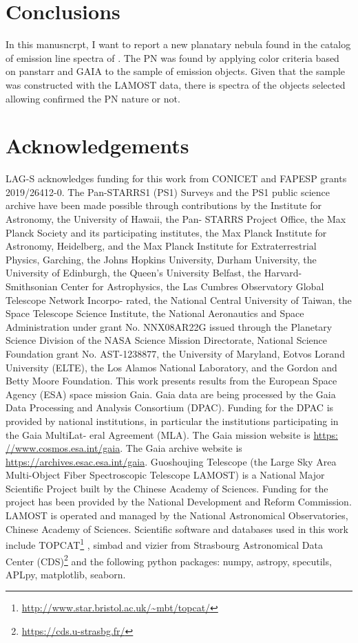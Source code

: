 \documentclass[fleqn,usenatbib]{mnras}
\begin{document}
{\section{Conclusions}
\label{sec:conclu}

In this manusncrpt, I want to report a new planatary nebula found
in the catalog of emission line spectra of \citet{Skoda:2020}.
The PN was found by applying color criteria based on panstarr
and GAIA to the sample of emission objects.
Given that the \citet{Skoda:2020} sample was constructed
with the LAMOST data, there is spectra of the objects selected
allowing confirmed the PN nature or not.

\section*{Acknowledgements}

LAG-S acknowledges funding for this work
from CONICET and FAPESP grants 2019/26412-0.
The Pan-STARRS1 (PS1) Surveys and the PS1 public science
archive have been made possible through contributions by the
Institute for Astronomy, the University of Hawaii, the Pan-
STARRS Project Office, the Max Planck Society and its
participating institutes, the Max Planck Institute for Astronomy,
Heidelberg, and the Max Planck Institute for Extraterrestrial
Physics, Garching, the Johns Hopkins University, Durham
University, the University of Edinburgh, the Queen’s University
Belfast, the Harvard-Smithsonian Center for Astrophysics, the
Las Cumbres Observatory Global Telescope Network Incorpo-
rated, the National Central University of Taiwan, the Space
Telescope Science Institute, the National Aeronautics and Space
Administration under grant No. NNX08AR22G issued through
the Planetary Science Division of the NASA Science Mission
Directorate, National Science Foundation grant No. AST-1238877,
the University of Maryland, Eotvos Lorand University
(ELTE), the Los Alamos National Laboratory, and the Gordon
and Betty Moore Foundation.
This work presents results from the European Space Agency
(ESA) space mission Gaia. Gaia data are being processed by
the Gaia Data Processing and Analysis Consortium (DPAC).
Funding for the DPAC is provided by national institutions, in
particular the institutions participating in the Gaia MultiLat-
eral Agreement (MLA). The Gaia mission website is \url{https:
//www.cosmos.esa.int/gaia}. The Gaia archive website is
\url{https://archives.esac.esa.int/gaia}.
Guoshoujing Telescope (the Large Sky Area Multi-Object Fiber Spectroscopic
Telescope LAMOST) is a National Major Scientific Project built by the Chinese
Academy of Sciences. Funding for the project has been provided by the National
Development and Reform Commission. LAMOST is operated and managed by the
National Astronomical Observatories, Chinese Academy of Sciences.
Scientific software
and databases used in this work include 
TOPCAT\footnote{\url{http://www.star.bristol.ac.uk/~mbt/topcat/}} \citep{Taylor:2005}, 
simbad and vizier from Strasbourg Astronomical Data Center (CDS)\footnote{\url{https://cds.u-strasbg.fr/}} 
and the following  python packages: numpy, astropy, specutils, APLpy, matplotlib, seaborn.
}
\end{document}
